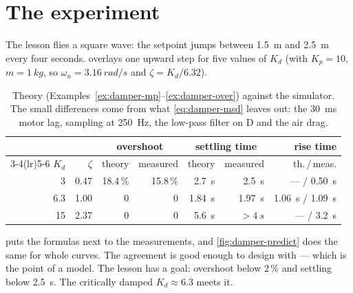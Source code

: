 \section{The experiment}

The lesson flies a square wave: the setpoint jumps between \SI{1.5}{m} and \SI{2.5}{m} every four seconds.  overlays one upward step for five values of $K_d$ (with $K_p = 10$, $m=\SI{1}{kg}$, so $\omega_n = \SI{3.16}{rad/s}$ and $\zeta = K_d/6.32$).


\begin{table}[h]
\centering\small\sffamily
\begin{tabular}{rrrrrrr}
\toprule
 & & \multicolumn{2}{c}{overshoot} & \multicolumn{2}{c}{settling time} & rise time\\
\cmidrule(lr){3-4}\cmidrule(lr){5-6}
$K_d$ & $\zeta$ & theory & measured & theory & measured & th.\,/\,meas.\\
\midrule
3 & 0.47 & 18.4\,\% & 15.8\,\% & \SI{2.7}{s} & \SI{2.5}{s} & — / \SI{0.50}{s}\\
6.3 & 1.00 & 0 & 0 & \SI{1.84}{s} & \SI{1.97}{s} & \SI{1.06}{s} / \SI{1.09}{s}\\
15 & 2.37 & 0 & 0 & \SI{5.6}{s} & $>\SI{4}{s}$ & — / \SI{3.2}{s}\\
\bottomrule
\end{tabular}
\caption{Theory (Examples~\ref{ex:damper-mp}–\ref{ex:damper-over}) against the simulator. The small differences come from what \cref{eq:damper-msd} leaves out: the \SI{30}{ms} motor lag, sampling at \SI{250}{Hz}, the low-pass filter on D and the air drag.}
\label{tab:damper}
\end{table}

 puts the formulas next to the measurements, and \cref{fig:damper-predict} does the same for whole curves. The agreement is good enough to design with — which is the point of a model. The lesson has a goal: overshoot below 2\,\% and settling below \SI{2.5}{s}. The critically damped $K_d \approx 6.3$ meets it.


